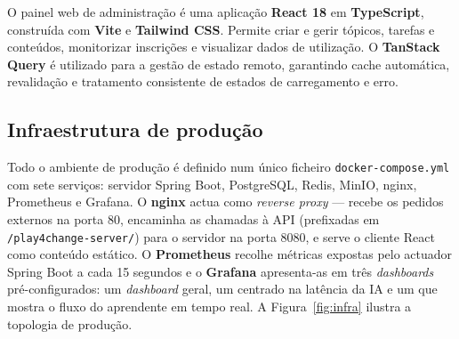 \begin{sloppypar}
O painel web de administração é uma aplicação \textbf{React 18} em \textbf{TypeScript}, construída com \textbf{Vite} e \textbf{Tailwind CSS}. Permite criar e gerir tópicos, tarefas e conteúdos, monitorizar inscrições e visualizar dados de utilização. O \textbf{TanStack Query} é utilizado para a gestão de estado remoto, garantindo cache automática, revalidação e tratamento consistente de estados de carregamento e erro.
\end{sloppypar}

\subsection*{Infraestrutura de produção}

Todo o ambiente de produção é definido num único ficheiro \texttt{docker-compose.yml} com sete serviços: servidor Spring Boot, PostgreSQL, Redis, MinIO, nginx, Prometheus e Grafana. O \textbf{nginx} actua como \emph{reverse proxy} --- recebe os pedidos externos na porta 80, encaminha as chamadas à API (prefixadas em \texttt{/play4change-server/}) para o servidor na porta 8080, e serve o cliente React como conteúdo estático. O \textbf{Prometheus} recolhe métricas expostas pelo actuador Spring Boot a cada 15 segundos e o \textbf{Grafana} apresenta-as em três \emph{dashboards} pré-configurados: um \emph{dashboard} geral, um centrado na latência da IA e um que mostra o fluxo do aprendente em tempo real. A Figura~\ref{fig:infra} ilustra a topologia de produção.

